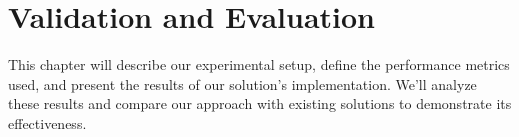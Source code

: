 \chapter{Validation and Evaluation}%
\label{chapter:validation-and-evaluation}

\begin{introduction}
This chapter will describe our experimental setup, define the performance metrics used, and present the results of our solution's implementation. We'll analyze these results and compare our approach with existing solutions to demonstrate its effectiveness.
\end{introduction}